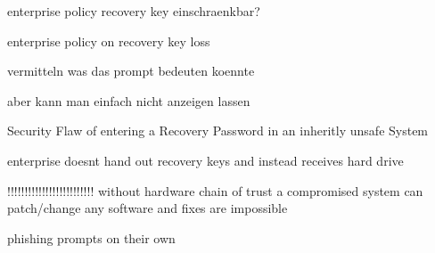 enterprise policy recovery key einschraenkbar?

enterprise policy on recovery key loss

vermitteln was das prompt bedeuten koennte

aber kann man einfach nicht anzeigen lassen

Security Flaw of entering a Recovery Password in an inheritly unsafe System

enterprise doesnt hand out recovery keys and instead receives hard drive


!!!!!!!!!!!!!!!!!!!!!!!!!
without hardware chain of trust a compromised system can patch/change any software and fixes are impossible

phishing prompts on their own